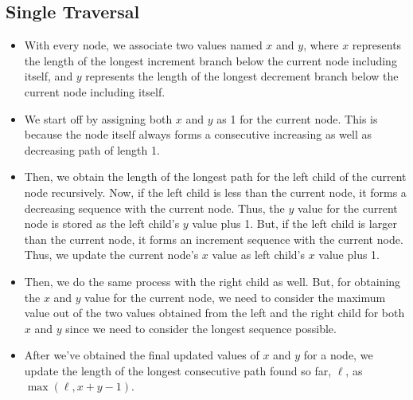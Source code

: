 \subsection{Single Traversal}
\begin{itemize}
\item With every node, we associate two values named $x$ and $y$, where $x$ represents the length of the longest increment branch below the current node including itself, and $y$ represents the length of the longest decrement branch below the current node including itself.
\item We start off by assigning both $x$ and $y$ as 1 for the current node. This is because the node itself always forms a consecutive increasing as well as decreasing path of length 1.
\item Then, we obtain the length of the longest path for the left child of the current node recursively. Now, if the left child is less than the current node, it forms a decreasing sequence with the current node. Thus, the $y$ value for the current node is stored as the left child's $y$ value plus 1. But, if the left child is larger than the current node, it forms an increment sequence with the current node. Thus, we update the current node's $x$ value as left child's $x$ value plus 1.
\item Then, we do the same process with the right child as well. But, for obtaining the $x$ and $y$ value for the current node, we need to consider the maximum value out of the two values obtained from the left and the right child for both $x$ and $y$ since we need to consider the longest sequence possible.
\item After we've obtained the final updated values of $x$ and $y$ for a node, we update the length of the longest consecutive path found so far, $\ell$, as $\max(\ell, x+y-1)$.
\end{itemize}

